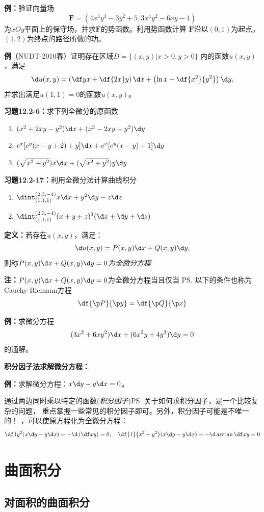 {\bf 例：}验证向量场
$$\bm{F}=(4x^3y^3-3y^2+5,3x^4y^2-6xy-4)$$
为$xOy$平面上的保守场，并求$\bm{F}$的势函数。利用势函数计算
$\bm{F}$沿以$(0,1)$为起点，$(1,2)$为终点的路径所做的功。

{\bf 例}（NUDT-2010春）证明存在区域$D=\{(x,y)|x>0,y>0\}$
内的函数$u(x,y)$，满足
$$\d u(x,y)=\left(\df yx+\df{2x}y\right)\d x
+\left(\ln x-\df{x^2}{y^2}\right)\d y,$$
并求出满足$u(1,1)=0$的函数$u(x,y)$。

{\bf 习题12.2-6：}求下列全微分的原函数
\begin{enumerate}[(1)]
  \setlength{\itemindent}{1cm}
  \item $(x^2+2xy-y^2)\d x+(x^2-2xy-y^2)\d y$
  \item $e^x[e^y(x-y+2)+y]\d x+e^x[e^y(x-y)+1]\d y$
  \item $(\sqrt{x^2+y^2})x\d x+(\sqrt{x^2+y^2})y\d y$
\end{enumerate}

{\bf 习题12.2-17：}利用全微分法计算曲线积分
\begin{enumerate}[(1)]
  \setlength{\itemindent}{1cm}
  \item $\dint_{(1,1,1)}^{(2,3,-4)}x\d x+y^2\d y-z\d z$
  \item $\dint_{(1,1,1)}^{(2,3,-4)}(x+y+z)^3(\d x+\d y+\d z)$
\end{enumerate}

{\bf 定义：}若存在$u(x,y)$，满足：
$$\d u(x,y)=P(x,y)\d x+Q(x,y)\d y,$$
则称{\it $P(x,y)\d x+Q(x,y)\d y=0$为全微分方程}

{\bf 注：}$P(x,y)\d x+Q(x,y)\d y=0$为全微分方程当且仅当
\ps{以下的条件也称为{\b Cauchy-Riemann方程}}
$$\df{\p P}{\p y}=\df{\p Q}{\p x}$$

{\bf 例：}求微分方程
$$(3x^2+6xy^2)\d x+(6x^2y+4y^3)\d y=0$$
的通解。

{\bf 积分因子法求解微分方程：}

{\bf 例：}求解微分方程：$x\d y-y\d x=0$。

通过两边同时乘以特定的函数({\it 积分因子})\ps{关于如何求积分因子，是一个比较复杂的问题，
重点掌握一些常见的积分因子即可。另外，积分因子可能是不唯一的！}
，可以使原方程化为全微分方程：
$${\df 1{y^2}}(x\d y-y\d x) =-\d\left(\df xy\right)
=0,\quad {\df{1}{x^2+y^2}}(x\d y-y\d x) =-\d\arctan\df xy=0$$

\section{曲面积分}

\subsection{对面积的曲面积分}


